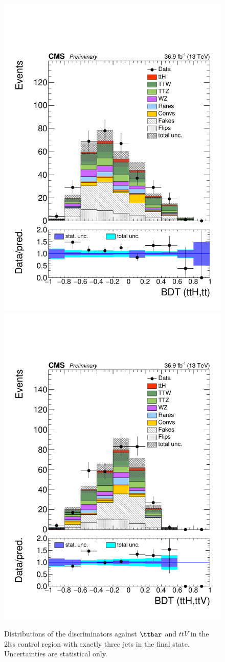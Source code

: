 \begin{figure}[!htb]
\centering
\includegraphics[width=0.35\linewidth]{plots_controlregions/cr_3j_data_frdata/kinMVA_2lss_ttbar.pdf}
\includegraphics[width=0.35\linewidth]{plots_controlregions/cr_3j_data_frdata/kinMVA_2lss_ttV.pdf}
\caption{Distributions of the discriminators against $\ttbar$ and $ttV$ in the 2lss control region with exactly three jets in the final state.
Uncertainties are statistical only.
}
\label{fig:cr_2lss_3j_3}
\end{figure}

